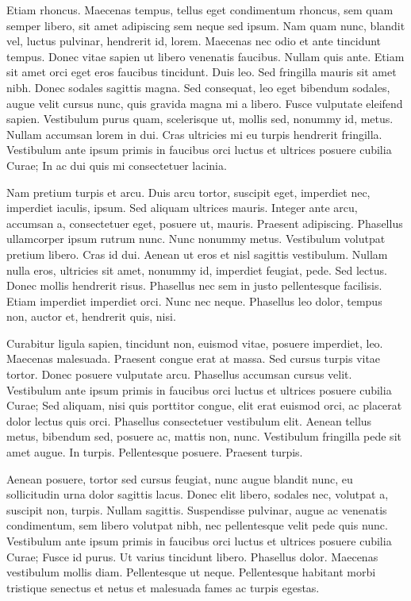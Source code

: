 \begin{multicols}{2}
Etiam rhoncus. Maecenas tempus, tellus eget condimentum rhoncus, sem
quam semper libero, sit amet adipiscing sem neque sed ipsum. Nam quam
nunc, blandit vel, luctus pulvinar, hendrerit id, lorem. Maecenas nec
odio et ante tincidunt tempus. Donec vitae sapien ut libero venenatis
faucibus. Nullam quis ante. Etiam sit amet orci eget eros faucibus
tincidunt. Duis leo. Sed fringilla mauris sit amet nibh. Donec sodales
sagittis magna. Sed consequat, leo eget bibendum sodales, augue velit
cursus nunc, quis gravida magna mi a libero. Fusce vulputate eleifend
sapien. Vestibulum purus quam, scelerisque ut, mollis sed, nonummy id,
metus. Nullam accumsan lorem in dui. Cras ultricies mi eu turpis
hendrerit fringilla. Vestibulum ante ipsum primis in faucibus orci
luctus et ultrices posuere cubilia Curae; In ac dui quis mi
consectetuer lacinia.

Nam pretium turpis et arcu. Duis arcu tortor, suscipit eget, imperdiet
nec, imperdiet iaculis, ipsum. Sed aliquam ultrices mauris. Integer
ante arcu, accumsan a, consectetuer eget, posuere ut, mauris. Praesent
adipiscing. Phasellus ullamcorper ipsum rutrum nunc. Nunc nonummy
metus. Vestibulum volutpat pretium libero. Cras id dui. Aenean ut eros
et nisl sagittis vestibulum. Nullam nulla eros, ultricies sit amet,
nonummy id, imperdiet feugiat, pede. Sed lectus. Donec mollis
hendrerit risus. Phasellus nec sem in justo pellentesque facilisis.
Etiam imperdiet imperdiet orci. Nunc nec neque. Phasellus leo dolor,
tempus non, auctor et, hendrerit quis, nisi.

Curabitur ligula sapien, tincidunt non, euismod vitae, posuere
imperdiet, leo. Maecenas malesuada. Praesent congue erat at massa. Sed
cursus turpis vitae tortor. Donec posuere vulputate arcu. Phasellus
accumsan cursus velit. Vestibulum ante ipsum primis in faucibus orci
luctus et ultrices posuere cubilia Curae; Sed aliquam, nisi quis
porttitor congue, elit erat euismod orci, ac placerat dolor lectus
quis orci. Phasellus consectetuer vestibulum elit. Aenean tellus
metus, bibendum sed, posuere ac, mattis non, nunc. Vestibulum
fringilla pede sit amet augue. In turpis. Pellentesque posuere.
Praesent turpis.

Aenean posuere, tortor sed cursus feugiat, nunc augue blandit nunc, eu
sollicitudin urna dolor sagittis lacus. Donec elit libero, sodales
nec, volutpat a, suscipit non, turpis. Nullam sagittis. Suspendisse
pulvinar, augue ac venenatis condimentum, sem libero volutpat nibh,
nec pellentesque velit pede quis nunc. Vestibulum ante ipsum primis in
faucibus orci luctus et ultrices posuere cubilia Curae; Fusce id
purus. Ut varius tincidunt libero. Phasellus dolor. Maecenas
vestibulum mollis diam. Pellentesque ut neque. Pellentesque habitant
morbi tristique senectus et netus et malesuada fames ac turpis
egestas.


\end{multicols}
